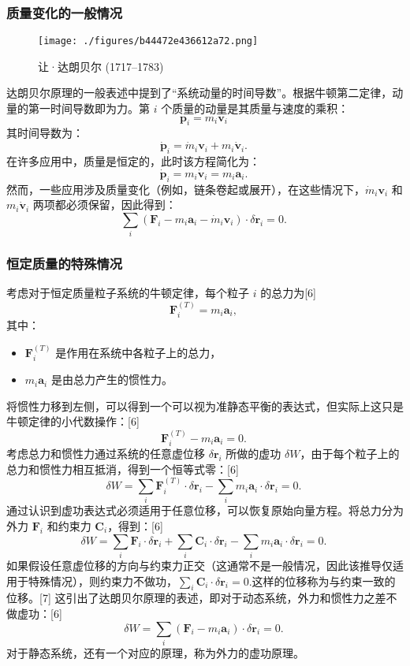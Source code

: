 \subsubsection{质量变化的一般情况}
\begin{figure}[ht]
\centering
\texttt{[image: ./figures/b44472e436612a72.png]}
\caption{让·达朗贝尔 (1717–1783)} \label{fig_DAP_2}
\end{figure}
达朗贝尔原理的一般表述中提到了“系统动量的时间导数”。根据牛顿第二定律，动量的第一时间导数即为力。第 \( i \) 个质量的动量是其质量与速度的乘积：
\[
\mathbf{p}_i = m_i \mathbf{v}_i~
\]
其时间导数为：
\[
\dot{\mathbf{p}}_i = \dot{m}_i \mathbf{v}_i + m_i \dot{\mathbf{v}}_i.~
\]
在许多应用中，质量是恒定的，此时该方程简化为：
\[
\dot{\mathbf{p}}_i = m_i \dot{\mathbf{v}}_i = m_i \mathbf{a}_i.~
\]
然而，一些应用涉及质量变化（例如，链条卷起或展开），在这些情况下，\(\dot{m}_i \mathbf{v}_i\) 和 \(m_i \dot{\mathbf{v}}_i\) 两项都必须保留，因此得到：
\[
\sum_{i} \left( \mathbf{F}_i - m_i \mathbf{a}_i - \dot{m}_i \mathbf{v}_i \right) \cdot \delta \mathbf{r}_i = 0.~
\]
\subsubsection{恒定质量的特殊情况}

考虑对于恒定质量粒子系统的牛顿定律，每个粒子 \( i \) 的总力为[6]
\[
\mathbf{F}_i^{(T)} = m_i \mathbf{a}_i,~
\]
其中：
\begin{itemize}
\item \( \mathbf{F}_i^{(T)} \) 是作用在系统中各粒子上的总力，
\item \( m_i \mathbf{a}_i \) 是由总力产生的惯性力。
\end{itemize}
将惯性力移到左侧，可以得到一个可以视为准静态平衡的表达式，但实际上这只是牛顿定律的小代数操作：[6]
\[
\mathbf{F}_i^{(T)} - m_i \mathbf{a}_i = 0.~
\]
考虑总力和惯性力通过系统的任意虚位移 \( \delta \mathbf{r}_i \) 所做的虚功 \( \delta W \)，由于每个粒子上的总力和惯性力相互抵消，得到一个恒等式零：[6]
\[
\delta W = \sum_i \mathbf{F}_i^{(T)} \cdot \delta \mathbf{r}_i - \sum_i m_i \mathbf{a}_i \cdot \delta \mathbf{r}_i = 0.~
\]
通过认识到虚功表达式必须适用于任意位移，可以恢复原始向量方程。将总力分为外力 \( \mathbf{F}_i \) 和约束力 \( \mathbf{C}_i \)，得到：[6]
\[
\delta W = \sum_i \mathbf{F}_i \cdot \delta \mathbf{r}_i + \sum_i \mathbf{C}_i \cdot \delta \mathbf{r}_i - \sum_i m_i \mathbf{a}_i \cdot \delta \mathbf{r}_i = 0.~
\]
如果假设任意虚位移的方向与约束力正交（这通常不是一般情况，因此该推导仅适用于特殊情况），则约束力不做功，\(\sum_i \mathbf{C}_i \cdot \delta \mathbf{r}_i = 0.\)这样的位移称为与约束一致的位移。[7] 这引出了达朗贝尔原理的表述，即对于动态系统，外力和惯性力之差不做虚功：[6]
\[
\delta W = \sum_i (\mathbf{F}_i - m_i \mathbf{a}_i) \cdot \delta \mathbf{r}_i = 0.~
\]
对于静态系统，还有一个对应的原理，称为外力的虚功原理。
